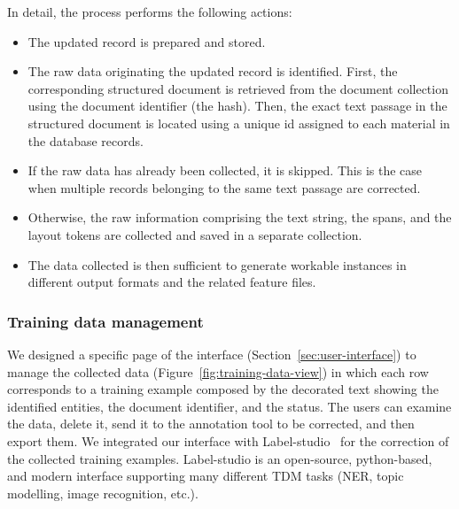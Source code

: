 In detail, the process performs the following actions:
\begin{itemize}
    \item The updated record is prepared and stored.
    \item The raw data originating the updated record is identified. First, the corresponding structured document is retrieved from the document collection using the document identifier (the hash). Then, the exact text passage in the structured document is located using a unique id assigned to each material in the database records.
    \item If the raw data has already been collected, it is skipped. This is the case when multiple records belonging to the same text passage are corrected.
    \item Otherwise, the raw information comprising the text string, the spans, and the layout tokens are collected and saved in a separate collection.
    \item The data collected is then sufficient to generate workable instances in different output formats and the related feature files.
\end{itemize}

\subsubsection{Training data management}
We designed a specific page of the interface (Section~\ref{sec:user-interface}) to manage the collected data (Figure~\ref{fig:training-data-view}) in which each row corresponds to a training example composed by the decorated text showing the identified entities, the document identifier, and the status. 
The users can examine the data, delete it, send it to the annotation tool to be corrected, and then export them.
We integrated our interface with Label-studio~\cite{Label_Studio} for the correction of the collected training examples. 
Label-studio is an open-source, python-based, and modern interface supporting many different TDM tasks (NER, topic modelling, image recognition, etc.). 

